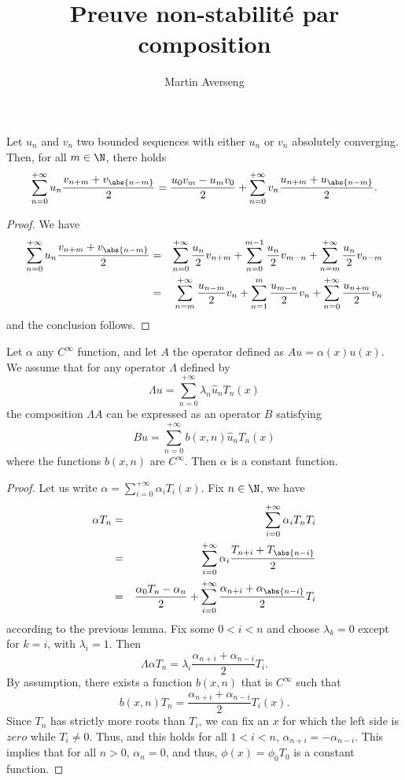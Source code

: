 \documentclass[]{article}
\title{Preuve non-stabilité par composition}
\author{Martin Averseng}
\begin{document}
	\maketitle
	\begin{Lem}
		Let $u_n$ and $v_n$ two bounded sequences with either $u_n$ or $v_n$ absolutely converging. Then, for all $m \in \N$, there holds
		\[ \sum_{n = 0}^{+ \infty} u_n \frac{v_{n + m} + v_{\abs{n - m}}}{2} = \frac{u_0 v_m - u_m v_0}{2} + \sum_{n = 0}^{+ \infty} v_n \frac{u_{n + m} + u_{\abs{n - m}}}{2}.\]
	\end{Lem}	
\begin{proof}
	We have 
	\begin{eqnarray*}
		\sum_{n = 0}^{+\infty} u_n \frac{v_{n + m} + v_{\abs{n - m}}}{2} &=& \sum_{n = 0}^{+ \infty} \frac{u_n}{2}v_{n + m} + \sum_{n = 0}^{m-1} \frac{u_n}{2} v_{m-n} + \sum_{n = m}^{+ \infty} \frac{u_n}{2}v_{n - m}\\
		&=& \sum_{n = m}^{+\infty}\frac{u_{n - m}}{2} v_n + \sum_{n = 1}^{m} \frac{u_{m - n}}{2} v_n + \sum_{n=0}^{+\infty} \frac{u_{n+m}}{2} v_n
	\end{eqnarray*}
	and the conclusion follows. 
\end{proof}
\begin{Lem} 
	Let $\alpha$ any $C^{\infty}$ function, and let $A$ the operator defined as $A u = \alpha(x) u(x)$. We assume that for any operator $\Lambda$ defined by 
	\[\Lambda u =  \sum_{n = 0}^{+\infty} \lambda_n \hat{u}_n T_n(x)\]
	the composition $\Lambda A$ can be expressed as an operator $B$ satisfying
	\[B u = \sum_{n = 0}^{+\infty} b(x,n) \hat{u}_n T_n(x)\]
	where the functions $b(x,n)$ are $C^{\infty}$. Then $\alpha$ is a constant function. 
	\begin{proof}
		Let us write $\alpha = \sum_{i = 0}^{+\infty} \alpha_i T_i(x)$. Fix $n \in \N$, we have 
		\begin{eqnarray*}
			\alpha T_n &=& \sum_{i = 0}^{+ \infty} \alpha_i T_n T_i\\
			&=& \sum_{i = 0}^{+ \infty} \alpha_i \frac{T_{n+i} + T_{\abs{n - i}}}{2}\\
			&=& \frac{\alpha_0 T_n - \alpha_n}{2} + \sum_{i = 0}^{+ \infty} \frac{\alpha_{n + i} + \alpha_{\abs{n - i}}}{2} T_i
		\end{eqnarray*}
	according to the previous lemma. Fix some $0 < i < n$ and choose $\lambda_k = 0$ except for $k = i$, with $\lambda_i = 1$. Then
	\[ \Lambda \alpha T_n = \lambda_{i} \frac{\alpha_{n + i}+ \alpha_{n - i}}{2}T_{i}.\]
	By assumption, there exists a function $b(x,n)$ that is $C^{\infty}$ such that 
	\[b(x,n) T_n =  \frac{\alpha_{n + i}+ \alpha_{n - i}}{2}T_{i}(x).\]
	Since $T_n$ has strictly more roots than $T_i$, we can fix an $x$ for which the left side is $zero$ while $T_i \neq 0$. Thus, and this holds for all $1 < i < n$, $\alpha_{n + i} = - \alpha_{n - i}$. This implies that for all $n > 0$, $\alpha_n = 0$, and thus, $\phi(x) = \phi_0 T_0$ is a constant function. 
	\end{proof}
\end{Lem}
\end{document}
